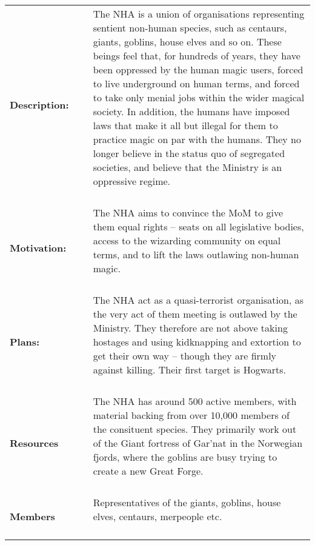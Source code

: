 \documentclass[oneside]{book}
\begin{document}
\begin{longtable}{p{} p{} p{} }

\bf Description: & ~ &\parbox[t]{\q cm}{The NHA is a union of organisations representing sentient non-human species, such as centaurs, giants, goblins, house elves and so on. These beings feel that, for hundreds of years, they have been oppressed by the human magic users, forced to live underground on human terms, and forced to take only menial jobs within the wider magical society. In addition, the humans have imposed laws that make it all but illegal for them to practice magic on par with the humans. They no longer believe in the status quo of segregated societies, and believe that the Ministry is an oppressive regime.\\~  } 
\\
\bf Motivation:	& ~ & \parbox[t]{\q cm}{ The NHA aims to convince the MoM to give them equal rights -- seats on all legislative bodies, access to the wizarding community on equal terms, and to lift the laws outlawing non-human magic.\\~  } 
\\
\bf Plans:	& ~ & \parbox[t]{\q cm}{The NHA act as a quasi-terrorist organisation, as the very act of them meeting is outlawed by the Ministry. They therefore are not above taking hostages and using kidknapping and extortion to get their own way -- though they are firmly against killing. Their first target is Hogwarts. \\~  } 
\\
\bf Resources & ~ & \parbox[t]{\q cm}{ The NHA has around 500 active members, with material backing from over 10,000 members of the consituent species. They primarily work out of the Giant fortress of Gar'nat in the Norwegian fjords, where the goblins are busy trying to create a new Great Forge.  \\ ~ }
\\
\bf Members	& ~ &  \parbox[t]{\q cm}{ Representatives of the giants, goblins, house elves, centaurs, merpeople etc.  \\ ~ }

\end{longtable}
\end{document}
